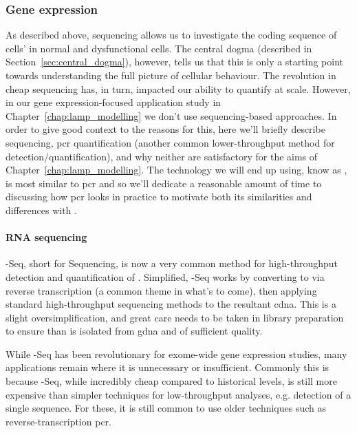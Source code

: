 \documentclass[thesis.tex]{subfiles}
\begin{document}
\subsubsection{Gene expression}
As described above,  sequencing allows us to investigate the coding sequence of cells'  in normal and dysfunctional cells. The central dogma (described in Section~\ref{sec:central_dogma}), however, tells us that this is only a starting point towards understanding the full picture of cellular behaviour. The revolution in cheap  sequencing has, in turn, impacted our ability to quantify  at scale. However, in our gene expression-focused application study in Chapter~\ref{chap:lamp_modelling} we don't use sequencing-based approaches. In order to give good context to the reasons for this, here we'll briefly describe  sequencing, \gls{pcr} quantification (another common lower-throughput method for  detection/quantification), and why neither are satisfactory for the aims of Chapter~\ref{chap:lamp_modelling}. The technology we will end up using, know as , is most similar to \gls{pcr} and so we'll dedicate a reasonable amount of time to discussing how \gls{pcr} looks in practice to motivate both its similarities and differences with .

\paragraph{RNA sequencing}
-Seq, short for  Sequencing, is now a very common method for high-throughput detection and quantification of  \citep{wang_rna-seq_2009}. Simplified, -Seq works by converting  to  via reverse transcription (a common theme in what's to come), then applying standard high-throughput sequencing methods to the resultant \gls{cdna}. This is a slight oversimplification, and great care needs to be taken in  library preparation to ensure than  is isolated from \gls{gdna} and of sufficient quality.

While -Seq has been revolutionary for exome-wide gene expression studies, many applications remain where it is unnecessary or insufficient. Commonly this is because -Seq, while incredibly cheap compared to historical levels, is still more expensive than simpler techniques for low-throughput analyses, e.g. detection of a single  sequence. For these, it is still common to use older techniques such as reverse-transcription \gls{pcr}. 
\end{document}
